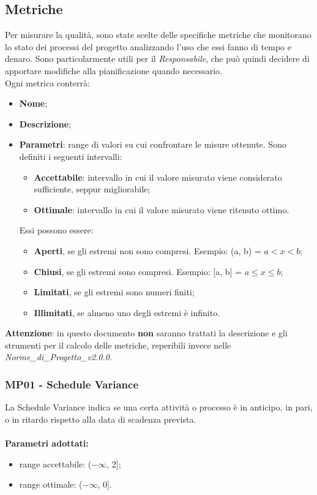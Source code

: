 \subsection{Metriche}
Per misurare la qualità, sono state scelte delle specifiche metriche che monitorano lo stato dei processi del progetto analizzando l'uso che essi fanno di tempo e denaro. Sono particolarmente utili per il \textit{Responsabile}, che può quindi decidere di apportare modifiche alla pianificazione quando necessario.\\
Ogni metrica conterrà:
\begin{itemize}
\item \textbf{Nome};
\item \textbf{Descrizione};
\item \textbf{Parametri}: range di valori su cui confrontare le misure ottenute. Sono definiti i seguenti intervalli: \begin{itemize}
\item \textbf{Accettabile}: intervallo in cui il valore misurato viene considerato sufficiente, seppur migliorabile;
\item \textbf{Ottimale}: intervallo in cui il valore misurato viene ritenuto ottimo.
\end{itemize}
Essi possono essere: \begin{itemize}
\item \textbf{Aperti}, se gli estremi non sono compresi. Esempio: (a, b) = $a < x < b$; 
\item \textbf{Chiusi}, se gli estremi sono compresi. Esempio: [a, b] = $a \leq x \leq b$;
\item \textbf{Limitati}, se gli estremi sono numeri finiti;
\item \textbf{Illimitati}, se almeno uno degli estremi è infinito.
\end{itemize}
\end{itemize}
\textbf{Attenzione}: in questo documento \textbf{non} saranno trattati la descrizione e gli strumenti per il calcolo delle metriche, reperibili invece nelle \textit{Norme\_di\_Progetto\_v2.0.0}.

\subsubsection{MP01 - Schedule Variance} 
La Schedule Variance indica se una certa attività o processo è in anticipo, in pari, o in ritardo rispetto alla data di scadenza prevista. \\ \\ 
\textbf{Parametri adottati:} 
\begin{itemize}
\item range accettabile: ($ -\infty $, 2];
\item range ottimale: ($ -\infty $, 0].
\end{itemize}

